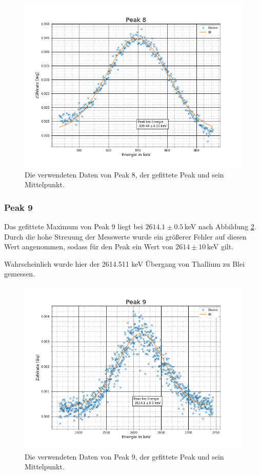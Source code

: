 \begin{figure}[h]
	\centering
	\includegraphics[scale=0.7]{Bilder/Anhang/P8}
	\caption[Thorium Peak 8]{\small Die verwendeten Daten von Peak 8, der gefittete Peak und sein Mittelpunkt.}
	\label{p8}
\end{figure}

\subsubsection{Peak 9}
Das gefittete Maximum von Peak 9 liegt bei $2614.1\pm0.5\,$keV nach Abbildung \ref{p9}. Durch die hohe Streuung der Messwerte wurde ein größerer Fehler auf diesen Wert angenommen, sodass für den Peak ein Wert von $2614\pm10\,$keV gilt.\par
Wahrscheinlich wurde hier der 2614.511 keV \cite{Thallium} Übergang von Thallium zu Blei gemessen.

\begin{figure}[h]
\centering
\includegraphics[scale=0.7]{Bilder/Anhang/P9}
\caption[Thorium Peak 9]{\small Die verwendeten Daten von Peak 9, der gefittete Peak und sein Mittelpunkt.}
\label{p9}
\end{figure}
\FloatBarrier